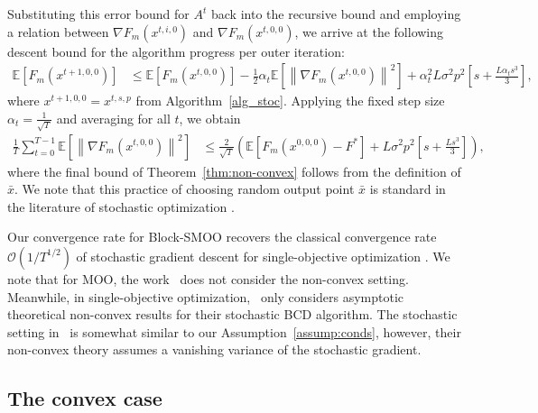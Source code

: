 \documentclass[11pt,a4paper]{article}
\numberwithin{equation}{section}%
\renewcommand{\(}{\left (}
\renewcommand{\)}{\right )}
\newcommand{\Lphif}{L}
\newcommand{\Fm}{F_m}
\begin{document}
Substituting this error bound for $A^t$ back into the recursive bound and employing a relation between $\nabla \Fm(x^{t,i,0}) $ and $\nabla \Fm(x^{t,0,0})$, we arrive at the following descent bound for the algorithm progress per outer iteration:
\begin{align}\label{eq:main_bound2}
\mathbb{E} [\Fm(x^{t+1,0,0})]
&\leq \mathbb{E} [\Fm(x^{t,0,0})]  -\frac{1}{2} \alpha_t \mathbb{E} \left[\left\| \nabla \Fm(x^{t,0,0})  \right\|^2 \right]   + \alpha_t^2 \Lphif \sigma^2 p^2\left[s + \frac{\Lphif \alpha_t  s^3}{3}\right],
\end{align}
where $x^{t+1,0,0} = x^{t,s,p}$ from Algorithm~\ref{alg_stoc}. 
Applying the fixed step size $\alpha_t = \frac{1}{\sqrt{T}}$ and averaging for all $t$, we obtain
\begin{align*}
\frac{1}{T}\sum_{t=0}^{T-1}  \mathbb{E} \left[\left\| \nabla \Fm(x^{t,0,0})  \right\|^2 \right] 
&\leq  \frac{2}{\sqrt{T}} \left(\mathbb{E} [\Fm(x^{0,0,0})- F^*]  + \Lphif \sigma^2 p^2\left[s + \frac{\Lphif s^3}{3}\right]\right),
\end{align*}
where the final bound of Theorem~\ref{thm:non-convex} follows from the definition of $\bar{x}$. We note that this practice of choosing random output point $\bar{x}$ is standard in the literature of stochastic optimization \cite{ghadimi2013stochastic}.

Our convergence rate for Block-SMOO recovers the classical convergence rate $\mathcal{O}(1/T^{1/2})$ of stochastic gradient descent for single-objective optimization \cite{ghadimi2013stochastic}.
We note that for MOO, the  work~\cite{SLiu_LNVicente_2019} does not consider the non-convex setting.  Meanwhile, in single-objective optimization,~\cite{xu2015blockstochasticgradientiteration} only considers asymptotic theoretical non-convex results for their stochastic BCD algorithm.  
The stochastic setting in~\cite{xu2015blockstochasticgradientiteration} is somewhat similar to our Assumption~\ref{assump:conds}, however, their non-convex  theory assumes a vanishing variance of the stochastic gradient. 

\subsection{The convex case}
\end{document}
